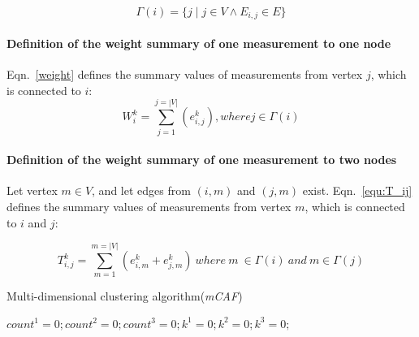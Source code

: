 \documentclass{mcmthesis}
\begin{document}
\begin{equation}\label{equ:varGamma}
\varGamma(i)=\{j\mid j\in V \wedge E_{i,j} \in E \}
\end{equation}

\paragraph{Definition of the weight summary of one measurement to one node} Eqn.~\eqref{weight} defines the summary values of measurements from vertex $j$, which is connected to $i$:
\begin{equation}\label{weight}
W_i^k=\sum_{j=1}^{j=|V|}(e_{i,j}^k), where j\in \varGamma(i)
\end{equation}

\paragraph{Definition of the weight summary of one measurement to two nodes}
Let vertex $m \in V$, and let edges from $(i, m)$ and $(j, m)$ exist. Eqn.~\eqref{equ:T_ij} defines the summary values of measurements from vertex $m$, which is connected to $i$ and $j$:

\begin{equation}\label{equ:T_ij}
T_{i,j}^k=\sum_{m=1}^{m=|V|}(e_{i,m}^k+e_{j,m}^k)\ where\ m\ \in \varGamma(i)\ and\ m \in \varGamma(j)
\end{equation}

\begin{minipage}[t]{0.9\textwidth}\centering
\begin{algorithm}[H]
	\caption{Multi-dimensional clustering algorithm(\emph{mCAF})}\label{alg:mcaf}
	\vspace{0.25\baselineskip}
	\BlankLine
	$count^1=0; count^2=0;count^3=0;k^1=0;k^2=0;k^3=0;$
	
\end{algorithm}
\BlankLine
\end{minipage}\\
\end{document}
